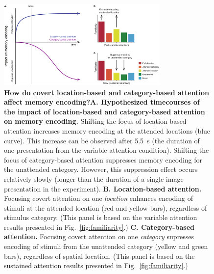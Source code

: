 \documentclass[english]{article}
\begin{document}
\begin{figure}[tp]
  \centering \includegraphics[width=0.75\textwidth]{figs/discussion_schematic}

  \caption{\textbf{How do covert location-based and category-based attention
  affect memory encoding?}\textbf{A. Hypothesized timecourses of the impact of
  location-based and category-based attention on memory encoding.} Shifting the
  focus of location-based attention increases memory encoding at the attended
  locations (blue curve). This increase can be observed after 5.5~s (the
  duration of one presentation from the variable attention condition). Shifting
  the focus of category-based attention suppresses memory encoding for the
  unattended category. However, this suppression effect occurs relatively
  slowly (longer than the duration of a single image presentation in the
  experiment). \textbf{B. Location-based attention.} Focusing covert attention
  on one \textit{location} enhances encoding of stimuli at the attended
  location (red and yellow bars), regardless of stimulus category.  (This panel
  is based on the variable attention results presented in Fig.~\ref{fig:familiarity}.)
  \textbf{C. Category-based attention.}  Focusing covert attention on one \textit{category}
  supresses encoding of stimuli from the unattended category (yellow and green bars),
  regardless of spatial location.  (This panel is based on the sustained attention
  results presented in Fig.~\ref{fig:familiarity}.)}

\label{fig:discussion}
\end{figure}
\end{document}
